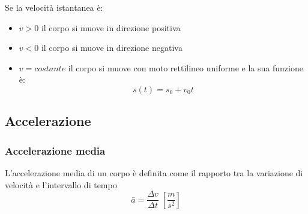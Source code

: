 \documentclass[a4paper]{article}
\theoremstyle{break}
\theoremstyle{break}
\theoremstyle{break}
\theoremstyle{break}
\begin{document}
Se la velocità istantanea è:
\begin{itemize}
	\item \( v > 0 \) il corpo si muove in direzione positiva
	\item \( v < 0 \) il corpo si muove in direzione negativa
	\item \( v = costante \) il corpo si muove con moto rettilineo uniforme e la sua funzione è:
    \[
    s(t) = s_0 + v_0t
    \] 
\end{itemize}

\subsection{Accelerazione}
\subsubsection{Accelerazione media}
\begin{definition}
  L'accelerazione media di un corpo è definita come il rapporto tra la variazione di velocità e l'intervallo di tempo
  \[
    \bar{a} = \frac{\Delta v}{\Delta t} \; \left[ \frac{m}{s^2} \right]
  \]
\end{definition}
\end{document}
